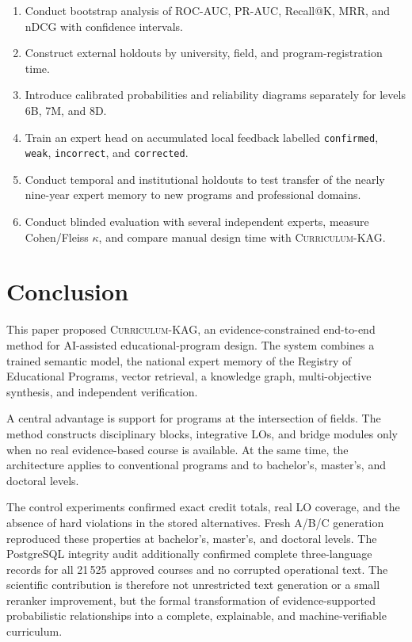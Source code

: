 \documentclass[twoside,11pt]{article}
\newcommand{\systemname}{\textsc{Curriculum-KAG}}
\begin{document}
\begin{enumerate}
  \item Conduct bootstrap analysis of ROC-AUC, PR-AUC, Recall@K, MRR, and nDCG with confidence intervals.
  \item Construct external holdouts by university, field, and program-registration time.
  \item Introduce calibrated probabilities and reliability diagrams separately for levels 6B, 7M, and 8D.
  \item Train an expert head on accumulated local feedback labelled \texttt{confirmed}, \texttt{weak}, \texttt{incorrect}, and \texttt{corrected}.
  \item Conduct temporal and institutional holdouts to test transfer of the nearly nine-year expert memory to new programs and professional domains.
  \item Conduct blinded evaluation with several independent experts, measure Cohen/Fleiss $\kappa$, and compare manual design time with \systemname{}.
\end{enumerate}

\section{Conclusion}

This paper proposed \systemname{}, an evidence-constrained end-to-end method for AI-assisted educational-program design. The system combines a trained semantic model, the national expert memory of the Registry of Educational Programs, vector retrieval, a knowledge graph, multi-objective synthesis, and independent verification.

A central advantage is support for programs at the intersection of fields. The method constructs disciplinary blocks, integrative LOs, and bridge modules only when no real evidence-based course is available. At the same time, the architecture applies to conventional programs and to bachelor's, master's, and doctoral levels.

The control experiments confirmed exact credit totals, real LO coverage, and the absence of hard violations in the stored alternatives. Fresh A/B/C generation reproduced these properties at bachelor's, master's, and doctoral levels. The PostgreSQL integrity audit additionally confirmed complete three-language records for all 21\,525 approved courses and no corrupted operational text. The scientific contribution is therefore not unrestricted text generation or a small reranker improvement, but the formal transformation of evidence-supported probabilistic relationships into a complete, explainable, and machine-verifiable curriculum.
\end{document}

